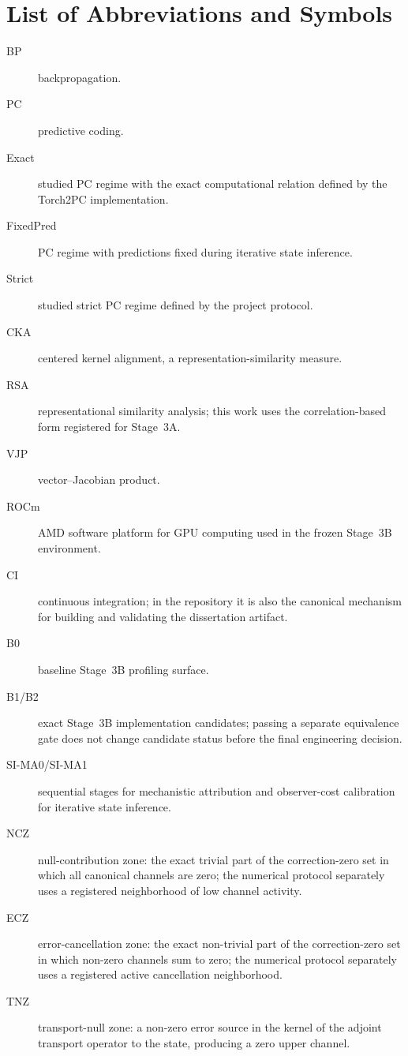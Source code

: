 \chapter*{List of Abbreviations and Symbols}

\begin{description}
  \item[BP] backpropagation.
  \item[PC] predictive coding.
  \item[Exact] studied PC regime with the exact computational relation defined by the Torch2PC implementation.
  \item[FixedPred] PC regime with predictions fixed during iterative state inference.
  \item[Strict] studied strict PC regime defined by the project protocol.
  \item[CKA] centered kernel alignment, a representation-similarity measure.
  \item[RSA] representational similarity analysis; this work uses the correlation-based form registered for Stage~3A.
  \item[VJP] vector--Jacobian product.
  \item[ROCm] AMD software platform for GPU computing used in the frozen Stage~3B environment.
  \item[CI] continuous integration; in the repository it is also the canonical mechanism for building and validating the dissertation artifact.
  \item[B0] baseline Stage~3B profiling surface.
  \item[B1/B2] exact Stage~3B implementation candidates; passing a separate equivalence gate does not change candidate status before the final engineering decision.
  \item[SI-MA0/SI-MA1] sequential stages for mechanistic attribution and observer-cost calibration for iterative state inference.
  \item[NCZ] null-contribution zone: the exact trivial part of the correction-zero set in which all canonical channels are zero; the numerical protocol separately uses a registered neighborhood of low channel activity.
  \item[ECZ] error-cancellation zone: the exact non-trivial part of the correction-zero set in which non-zero channels sum to zero; the numerical protocol separately uses a registered active cancellation neighborhood.
  \item[TNZ] transport-null zone: a non-zero error source in the kernel of the adjoint transport operator to the state, producing a zero upper channel.

\end{description}
